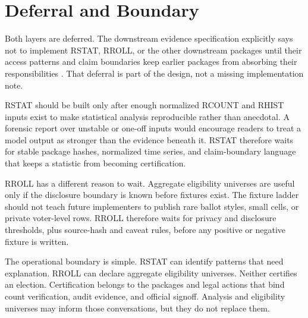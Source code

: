 \section{Deferral and Boundary}

Both layers are deferred. The downstream evidence specification explicitly says
not to implement RSTAT, RROLL, or the other downstream packages until their
access patterns and claim boundaries keep earlier packages from absorbing their
responsibilities \citep{civic-evidence-boundaries-2026}. That deferral is part
of the design, not a missing implementation note.

RSTAT should be built only after enough normalized RCOUNT and RHIST inputs exist
to make statistical analysis reproducible rather than anecdotal. A forensic
report over unstable or one-off inputs would encourage readers to treat a model
output as stronger than the evidence beneath it. RSTAT therefore waits for
stable package hashes, normalized time series, and claim-boundary language that
keeps a statistic from becoming certification.

RROLL has a different reason to wait. Aggregate eligibility universes are useful
only if the disclosure boundary is known before fixtures exist. The fixture
ladder should not teach future implementers to publish rare ballot styles,
small cells, or private voter-level rows. RROLL therefore waits for privacy and
disclosure thresholds, plus source-hash and caveat rules, before any positive or
negative fixture is written.

The operational boundary is simple. RSTAT can identify patterns that need
explanation. RROLL can declare aggregate eligibility universes. Neither
certifies an election. Certification belongs to the packages and legal actions
that bind count verification, audit evidence, and official signoff. Analysis and
eligibility universes may inform those conversations, but they do not replace
them.
